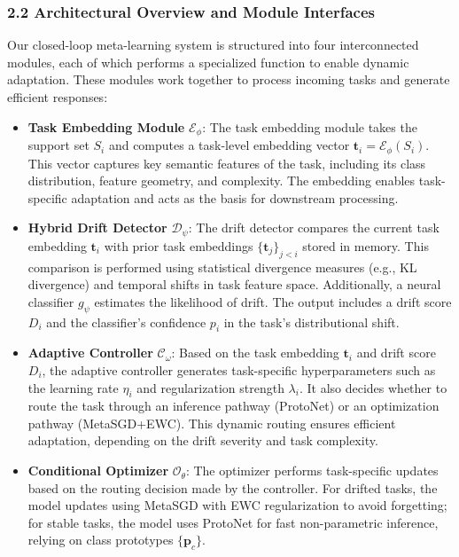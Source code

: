 \documentclass[conference]{IEEEtran}
\begin{document}
\subsubsection*{2.2 Architectural Overview and Module Interfaces}

Our closed-loop meta-learning system is structured into four interconnected modules, each of which performs a specialized function to enable dynamic adaptation. These modules work together to process incoming tasks and generate efficient responses:

\begin{itemize}
    \item \textbf{Task Embedding Module} $\mathcal{E}_\phi$: The task embedding module takes the support set $S_i$ and computes a task-level embedding vector $\mathbf{t}_i = \mathcal{E}_\phi(S_i)$. This vector captures key semantic features of the task, including its class distribution, feature geometry, and complexity. The embedding enables task-specific adaptation and acts as the basis for downstream processing.
    
    \item \textbf{Hybrid Drift Detector} $\mathcal{D}_\psi$: The drift detector compares the current task embedding $\mathbf{t}_i$ with prior task embeddings $\{\mathbf{t}_j\}_{j<i}$ stored in memory. This comparison is performed using statistical divergence measures (e.g., KL divergence) and temporal shifts in task feature space. Additionally, a neural classifier $g_\psi$ estimates the likelihood of drift. The output includes a drift score $D_i$ and the classifier’s confidence $p_i$ in the task's distributional shift.

    \item \textbf{Adaptive Controller} $\mathcal{C}_\omega$: Based on the task embedding $\mathbf{t}_i$ and drift score $D_i$, the adaptive controller generates task-specific hyperparameters such as the learning rate $\eta_i$ and regularization strength $\lambda_i$. It also decides whether to route the task through an inference pathway (ProtoNet) or an optimization pathway (MetaSGD+EWC). This dynamic routing ensures efficient adaptation, depending on the drift severity and task complexity.

    \item \textbf{Conditional Optimizer} $\mathcal{O}_\theta$: The optimizer performs task-specific updates based on the routing decision made by the controller. For drifted tasks, the model updates using MetaSGD with EWC regularization to avoid forgetting; for stable tasks, the model uses ProtoNet for fast non-parametric inference, relying on class prototypes $\{\mathbf{p}_c\}$.
\end{itemize}
\end{document}
